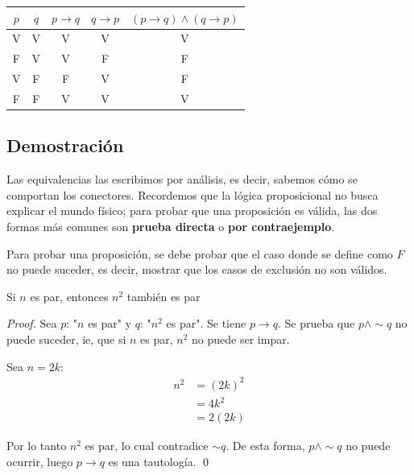\documentclass{book}
\begin{document}
  \begin{tabular}{c|c|c|c|c}
  $p$ & $q$ & $p \to q$ & $q \to p$ & $(p \to q) \land (q \to p)$ \\
  \hline
  V & V & V & V & V \\
  F & V & V & F & F \\
  V & F & F & V & F \\
  F & F & V & V & V \\
  \end{tabular}
  
  \subsection{Demostración}
  
  Las equivalencias las escribimos por análisis, es decir, sabemos cómo se comportan los
  conectores. Recordemos que la lógica proposicional no busca explicar el mundo físico;
  para probar que una proposición es válida, las dos formas más comunes son
  \textbf{prueba directa} o \textbf{por contraejemplo}.

  Para probar una proposición, se debe probar que el caso donde se define como $F$
  no puede suceder, es decir, mostrar que los casos de exclusión no son válidos.
  
  \begin{proposition}
    Si $n$ es par, entonces $n^2$ también es par
    \begin{proof}
      Sea $p$: "$n$ es par" y $q$: "$n^2$ es par". Se tiene $p \to q$.
      Se prueba que $p \land \sim q$ no puede suceder, ie, que si $n$ es par, $n^2$ no puede ser impar.
      
      Sea $n = 2k$:
      \begin{align}
      n^2 &= (2k)^2 \\
          &= 4k^2 \\
          &= 2(2k)
      \end{align}
      
      Por lo tanto $n^2$ es par, lo cual contradice $\sim q$. De esta forma, $p \land \sim q$
      no puede ocurrir, luego $p \to q$ es una tautología. \qed
    \end{proof}
  \end{proposition}
  
\end{document}
